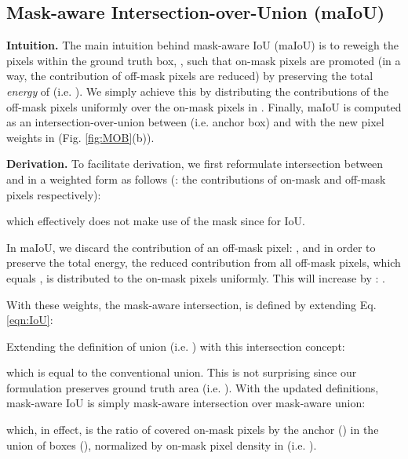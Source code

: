 \documentclass{bmvc2k}
\begin{document}
\subsection{Mask-aware Intersection-over-Union (maIoU)}
\label{subsec:maIoU}
\noindent \textbf{Intuition.} The main intuition behind mask-aware IoU (maIoU) is to reweigh the pixels within the ground truth box, , such that on-mask pixels are promoted (in a way, the contribution of off-mask pixels are reduced) by preserving the total \textit{energy} of  (i.e. ). We simply achieve this by distributing the contributions of the off-mask pixels uniformly over the on-mask pixels in . Finally, maIoU is computed as an intersection-over-union between  (i.e. anchor box) and  with the new pixel weights in  (Fig. \ref{fig:MOB}(b)).

\noindent \textbf{Derivation.} To facilitate derivation, we first reformulate intersection  between  and  in a weighted form as follows (: the contributions of on-mask and off-mask pixels respectively):

which effectively does not make use of the mask  since  for IoU. 

In maIoU, we discard the contribution of an off-mask pixel: , and in order to preserve the total energy, the reduced contribution from all off-mask pixels, which equals , is distributed to the on-mask pixels uniformly. This will increase  by : . 

With these weights, the mask-aware intersection,  is defined by extending Eq. \ref{eqn:IoU}:

Extending the definition of union (i.e. ) with this intersection concept:

which is equal to the conventional union. This is not surprising since our formulation preserves ground truth area (i.e. ). With the updated definitions, mask-aware IoU is simply mask-aware intersection over mask-aware union:

which, in effect, is the ratio of covered on-mask pixels by the anchor () in the union of boxes (), normalized by on-mask pixel density in  (i.e. ).
\end{document}
